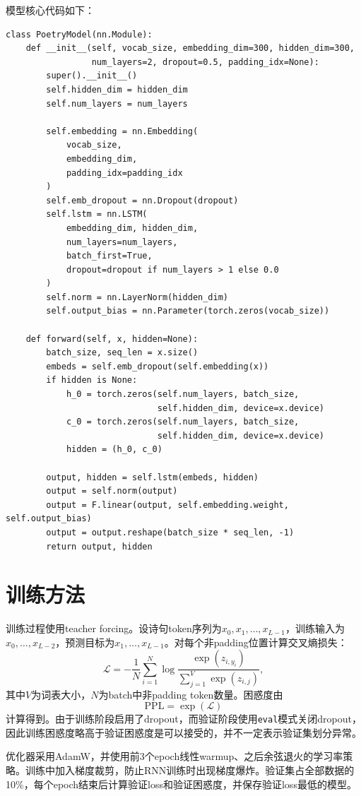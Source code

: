 \documentclass[11pt]{article}
\begin{document}
	模型核心代码如下：
	\begin{lstlisting}
class PoetryModel(nn.Module):
    def __init__(self, vocab_size, embedding_dim=300, hidden_dim=300,
                 num_layers=2, dropout=0.5, padding_idx=None):
        super().__init__()
        self.hidden_dim = hidden_dim
        self.num_layers = num_layers

        self.embedding = nn.Embedding(
            vocab_size,
            embedding_dim,
            padding_idx=padding_idx
        )
        self.emb_dropout = nn.Dropout(dropout)
        self.lstm = nn.LSTM(
            embedding_dim, hidden_dim,
            num_layers=num_layers,
            batch_first=True,
            dropout=dropout if num_layers > 1 else 0.0
        )
        self.norm = nn.LayerNorm(hidden_dim)
        self.output_bias = nn.Parameter(torch.zeros(vocab_size))

    def forward(self, x, hidden=None):
        batch_size, seq_len = x.size()
        embeds = self.emb_dropout(self.embedding(x))
        if hidden is None:
            h_0 = torch.zeros(self.num_layers, batch_size,
                              self.hidden_dim, device=x.device)
            c_0 = torch.zeros(self.num_layers, batch_size,
                              self.hidden_dim, device=x.device)
            hidden = (h_0, c_0)

        output, hidden = self.lstm(embeds, hidden)
        output = self.norm(output)
        output = F.linear(output, self.embedding.weight, self.output_bias)
        output = output.reshape(batch_size * seq_len, -1)
        return output, hidden
	\end{lstlisting}

	\section{训练方法}
	训练过程使用teacher forcing。设诗句token序列为$x_0,x_1,\ldots,x_{L-1}$，训练输入为$x_0,\ldots,x_{L-2}$，预测目标为$x_1,\ldots,x_{L-1}$。对每个非padding位置计算交叉熵损失：
	\[
		\mathcal{L}=-\frac{1}{N}\sum_{i=1}^{N}
		\log\frac{\exp(z_{i,y_i})}{\sum_{j=1}^{V}\exp(z_{i,j})},
	\]
	其中$V$为词表大小，$N$为batch中非padding token数量。困惑度由
	\[
		\mathrm{PPL}=\exp(\mathcal{L})
	\]
	计算得到。由于训练阶段启用了dropout，而验证阶段使用\texttt{eval}模式关闭dropout，因此训练困惑度略高于验证困惑度是可以接受的，并不一定表示验证集划分异常。

	优化器采用AdamW，并使用前3个epoch线性warmup、之后余弦退火的学习率策略。训练中加入梯度裁剪，防止RNN训练时出现梯度爆炸。验证集占全部数据的10\%，每个epoch结束后计算验证loss和验证困惑度，并保存验证loss最低的模型。
\end{document}
